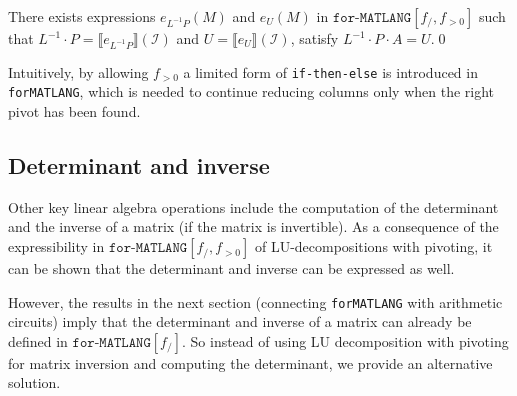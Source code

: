 \documentclass[sigconf]{acmart}
\newcommand{\sem}[2]{\llbracket #1 \rrbracket(#2)}
\newcommand{\I}{\mathcal{I}}
\newcommand{\langfor}{\texttt{for}\text{-}\texttt{MATLANG}\xspace}
\newcommand{\langforf}[1]{\texttt{for}\text{-}\texttt{MATLANG}[#1]\xspace}
\begin{document}
\begin{proposition}\label{prop:palu}
There exists expressions $e_{L^{-1}P}(M)$ and $e_U(M)$ in $\langforf{f_/,f_{>0}}$  such that
$L^{-1}\cdot P=\sem{e_{L^{-1}P}}{\I}$ and $U=\sem{e_U}{\I}$, satisfy $L^{-1}\cdot P\cdot A=U$.\qed
\end{proposition}
Intuitively, by allowing $f_{>0}$ a limited form of \texttt{if-then-else} is introduced in \langfor, which is needed
to continue reducing columns only when the right pivot has been found.


\subsection{Determinant and inverse}
Other key linear algebra operations include the computation of the determinant and
the inverse of a matrix (if the matrix is invertible). As a consequence of the expressibility
in $\langforf{f_/,f_{>0}}$ of LU-decompositions with pivoting, it can be shown that the determinant
and inverse can be expressed as well. 

However, the results
in the next section (connecting \langfor with arithmetic circuits) imply that the determinant
and inverse of a matrix can already be defined in $\langforf{f_/}$. So instead of using LU decomposition with pivoting for matrix inversion and computing the determinant, we provide an alternative solution.
\end{document}

